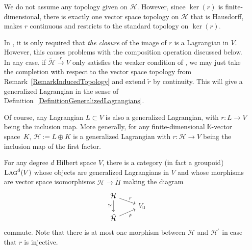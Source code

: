 \documentclass[pdftex]{sigma}
\numberwithin{equation}{section}
\newcommand{\Lag}{\textsc{Lag}}
\begin{document}
\begin{Remark}
\label{RemarkInducedTopology}
 We do not assume any topology given on $\mathcal{H}$.
 However, since $\ker(r)$ is finite-dimensional, there is exactly one vector space topology on $\mathcal{H}$ that is Hausdorff, makes $r$ continuous and restricts to the standard topology on $\ker(r)$.
\end{Remark}

\begin{Remark}
In \cite[Definition~2.2.9]{StolzTeichnerElliptic}, it is only required that \emph{the closure} of the image of $r$ is a Lagrangian in $V$.
However, this causes problems with the composition operation discussed below.
In any case, if $\tilde{\mathcal{H}} \stackrel{r}{\to} V$ only satisfies the weaker condition of \cite{StolzTeichnerElliptic}, we may just take the completion with respect to the vector space topology from Remark~\ref{RemarkInducedTopology} and extend $\tilde{r}$ by continuity.
This will give a generalized Lagrangian in the sense of Definition~\ref{DefinitionGeneralizedLagrangians}.
\end{Remark}

\begin{Example}
 Of course, any Lagrangian $L \subset V$ is also a generalized Lagrangian, with $r\colon L \to V$ being the inclusion map.
 More generally, for any finite-dimensional $\mathbb{K}$-vector space~$K$, $\mathcal{H} := L \oplus K$ is a generalized Lagrangian with $r\colon \mathcal{H} \to V$ being the inclusion map of the first factor.
\end{Example}

 For any degree $d$ Hilbert space $V$, there is a category (in fact a groupoid) $\Lag^d(V)$ whose objects are generalized Lagrangians in $V$ and whose morphisms are vector space isomorphisms $\mathcal{H} \to \tilde{H}$ making the diagram
 \begin{equation*}
\begin{tikzcd}[row sep = 0.2mm]
 \mathcal{H} \ar[dr, "r"] \ar[dd, "\cong"']&\\
 & V_0 \\
\tilde{\mathcal{H}} \ar[ur, "\tilde{r}"'] &
\end{tikzcd}
\end{equation*}
commute.
Note that there is at most one morphism between $\mathcal{H}$ and $\mathcal{H}^\prime$ in case that $r$ is injective.
\end{document}
